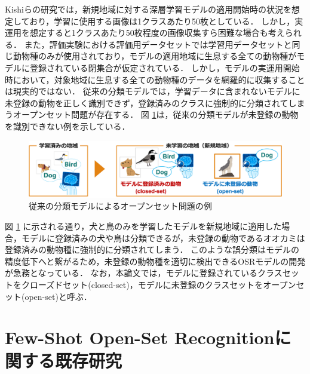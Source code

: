 \documentclass[a4paper,11pt,nomag]{jsreport}
\begin{document}
Kishiらの研究では，新規地域に対する深層学習モデルの適用開始時の状況を想定しており，学習に使用する画像は1クラスあたり50枚としている．
しかし，実運用を想定すると1クラスあたり50枚程度の画像収集すら困難な場合も考えられる．
また，評価実験における評価用データセットでは学習用データセットと同じ動物種のみが使用されており，モデルの適用地域に生息する全ての動物種がモデルに登録されている閉集合が仮定されている．
しかし，モデルの実運用開始時において，対象地域に生息する全ての動物種のデータを網羅的に収集することは現実的ではない．
従来の分類モデルでは，学習データに含まれないモデルに未登録の動物を正しく識別できず，登録済みのクラスに強制的に分類されてしまうオープンセット問題が存在する．
図 \ref{fig:non_osr}は，従来の分類モデルが未登録の動物を識別できない例を示している．
% 
\begin{figure}[tbp]
  \centering
  \includegraphics[width=\linewidth, keepaspectratio]{image/non_osr.png}
  \caption{従来の分類モデルによるオープンセット問題の例}
  \label{fig:non_osr}
\end{figure}
% 
図 \ref{fig:non_osr} に示される通り，犬と鳥のみを学習したモデルを新規地域に適用した場合，モデルに登録済みの犬や鳥は分類できるが，未登録の動物であるオオカミは登録済みの動物種に強制的に分類されてしまう．
このような誤分類はモデルの精度低下へと繋がるため，未登録の動物種を適切に検出できるOSRモデルの開発が急務となっている．
なお，本論文では，モデルに登録されているクラスセットをクローズドセット(closed-set)，モデルに未登録のクラスセットをオープンセット(open-set)と呼ぶ．


\section{Few-Shot Open-Set Recognitionに関する既存研究}
\end{document}
